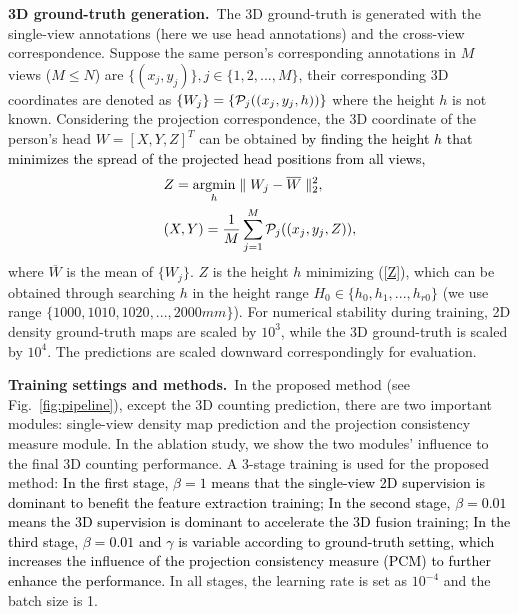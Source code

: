 \documentclass[letterpaper]{article}
\newcommand{\abc}[1]{\textcolor{black}{#1}}
\newcommand{\zq}[1]{\textcolor{black}{#1}} %
\begin{document}
\textbf{3D ground-truth generation.}~The 3D ground-truth is generated with the single-view annotations (here we use head annotations) and the cross-view correspondence. Suppose the same person's corresponding annotations in $M$ views ($M$$\leq$$N$) are $\{(x_j, y_j)\}, j\in\{1, 2, ..., M\}$, their corresponding 3D coordinates are denoted as $\{W_j\} = \{{{\cal P}_j}((x_j, y_j, h))\}$ where the height $h$ is not known. Considering the projection correspondence, the 3D coordinate of the person's head $W=[X, Y, Z]^T$ can be obtained \abc{by finding the height $h$ that minimizes the spread of the projected head positions from all views,}
\begin{align}
     &Z = \mathop{\mathrm{argmin}}_h \parallel W_j - \overline{W} \parallel^2_2, \label{Z} \\
     &(X, Y) = \frac{1}{M}\sum^M_{j=1}{{\cal P}_j}((x_j, y_j, Z)), \label{X_Y}
\end{align}
where $\overline{W}$ is the mean of $\{W_j\}$. $Z$ is the height $h$ minimizing (\ref{Z}), which can be obtained through searching $h$ in the height range $H_0 \in \{h_0, h_1, ..., h_{r0}\}$ (we use range $\{1000, 1010, 1020, ... , 2000 mm\}$). %
For numerical stability during training, 2D density  ground-truth maps are scaled by $10^3$,  while the 3D ground-truth is scaled by $10^4$.
The predictions are scaled downward correspondingly for evaluation.


\textbf{Training settings and methods.}~In the proposed method (see Fig.~\ref{fig:pipeline}), except the 3D counting prediction, there are two important modules: single-view density map prediction and the projection consistency measure module. In the ablation study, we show the two modules' influence to the final 3D counting performance.
A 3-stage training is used for the proposed method:
\zq{In the first stage, $\beta=1$ means that the single-view 2D supervision is dominant to benefit the feature extraction training; In the second stage, $\beta=0.01$ means the 3D supervision is dominant  to accelerate the 3D fusion training; In the third stage,  $\beta=0.01$ and
$\gamma$ is variable according to ground-truth setting,
which increases the influence of the projection consistency measure (PCM)  %
to further enhance the performance.} In all stages, the learning rate is set as $10^{-4}$ and the batch size is 1.
\end{document}
